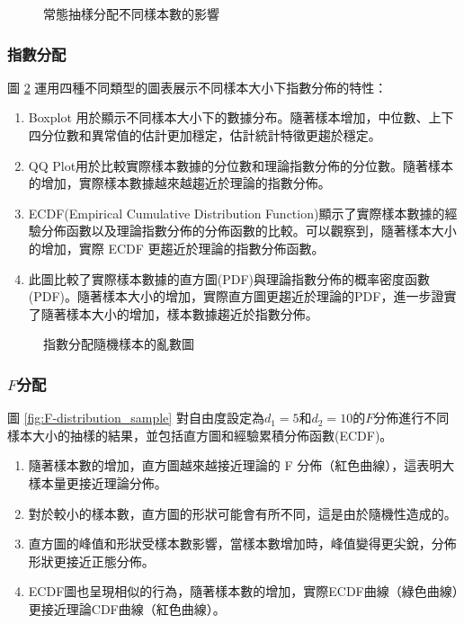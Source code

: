 \documentclass[12pt, a4paper]{article}
\begin{document}
\begin{figure}[H]
    \caption{常態抽樣分配不同樣本數的影響}
    \label{fig:normal-distribution_sample}
\end{figure}

\subsubsection{指數分配}
圖 \ref{fig:rnb_exponential_distribution} 運用四種不同類型的圖表展示不同樣本大小下指數分佈的特性：
\begin{enumerate}
\item Boxplot 用於顯示不同樣本大小下的數據分布。隨著樣本增加，中位數、上下四分位數和異常值的估計更加穩定，估計統計特徵更趨於穩定。
\item QQ Plot用於比較實際樣本數據的分位數和理論指數分佈的分位數。隨著樣本的增加，實際樣本數據越來越趨近於理論的指數分佈。
\item ECDF(Empirical Cumulative Distribution Function)顯示了實際樣本數據的經驗分佈函數以及理論指數分佈的分佈函數的比較。可以觀察到，隨著樣本大小的增加，實際 ECDF 更趨近於理論的指數分佈函數。
\item 此圖比較了實際樣本數據的直方圖(PDF)與理論指數分佈的概率密度函數(PDF)。隨著樣本大小的增加，實際直方圖更趨近於理論的PDF，進一步證實了隨著樣本大小的增加，樣本數據趨近於指數分佈。
\end{enumerate}
\begin{figure}[H]
    \caption{指數分配隨機樣本的亂數圖}
    \label{fig:rnb_exponential_distribution}
\end{figure}

\subsubsection{$F$分配}
圖 \ref{fig:F-distribution_sample} 對自由度設定為$d_1=5$和$d_2=10$的$F$分佈進行不同樣本大小的抽樣的結果，並包括直方圖和經驗累積分佈函數(ECDF)。
\begin{enumerate}
\item 隨著樣本數的增加，直方圖越來越接近理論的 F 分佈（紅色曲線），這表明大樣本量更接近理論分佈。
\item 對於較小的樣本數，直方圖的形狀可能會有所不同，這是由於隨機性造成的。
\item 直方圖的峰值和形狀受樣本數影響，當樣本數增加時，峰值變得更尖銳，分佈形狀更接近正態分佈。
\item ECDF圖也呈現相似的行為，隨著樣本數的增加，實際ECDF曲線（綠色曲線）更接近理論CDF曲線（紅色曲線）。
\end{enumerate}
\end{document}
